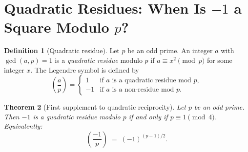 \documentclass[12pt,a4paper]{amsart}
\newtheorem{theorem}{Theorem}[section]
\theoremstyle{definition}
\newtheorem{definition}[theorem]{Definition}
\newcommand{\leg}[2]{\left(\frac{#1}{#2}\right)}
\begin{document}
\section{Quadratic Residues: When Is $-1$ a Square Modulo $p$?}

\begin{definition}[Quadratic residue]\label{def:quadratic_residue}
  Let $p$ be an odd prime.  An integer $a$ with $\gcd(a,p) = 1$ is a
  \emph{quadratic residue} modulo $p$ if $a \equiv x^2 \pmod p$ for some
  integer $x$.  The Legendre symbol is defined by
  \[
    \leg{a}{p} =
    \begin{cases}
      1  & \text{if } a \text{ is a quadratic residue mod } p, \\
      -1 & \text{if } a \text{ is a non-residue mod } p.
    \end{cases}
  \]
\end{definition}

\begin{theorem}[First supplement to quadratic reciprocity]\label{thm:minus1_qr}
  Let $p$ be an odd prime.  Then $-1$ is a quadratic residue modulo $p$
  if and only if $p \equiv 1 \pmod 4$.  Equivalently:
  \[
    \leg{-1}{p} \;=\; (-1)^{(p-1)/2}.
  \]
\end{theorem}
\end{document}
